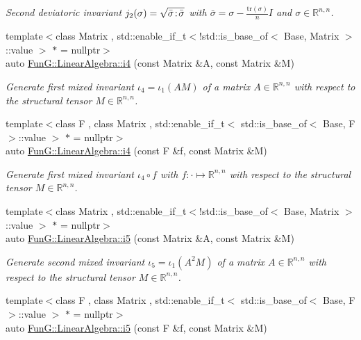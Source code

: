 \begin{DoxyCompactItemize}
\begin{DoxyCompactList}\small\item\em Second deviatoric invariant $ j_2(\sigma)=\sqrt{\bar\sigma\negthinspace:\negthinspace\bar\sigma} $ with $\bar\sigma = \sigma - \frac{\mathrm{tr}(\sigma)}{n}I$ and $\sigma\in\mathbb{R}^{n,n}$. \end{DoxyCompactList}\item 
{\footnotesize template$<$class Matrix , std\-::enable\-\_\-if\-\_\-t$<$!std\-::is\-\_\-base\-\_\-of$<$ Base, Matrix $>$\-::value $>$ $\ast$  = nullptr$>$ }\\auto \hyperlink{group__InvariantGroup_ga1898785172ecce11af0c27e54d555009}{Fun\-G\-::\-Linear\-Algebra\-::i4} (const Matrix \&A, const Matrix \&M)
\begin{DoxyCompactList}\small\item\em Generate first mixed invariant $ \iota_4=\iota_1(AM) $ of a matrix $A\in\mathbb{R}^{n,n}$ with respect to the structural tensor $M\in\mathbb{R}^{n,n}$. \end{DoxyCompactList}\item 
{\footnotesize template$<$class F , class Matrix , std\-::enable\-\_\-if\-\_\-t$<$ std\-::is\-\_\-base\-\_\-of$<$ Base, F $>$\-::value $>$ $\ast$  = nullptr$>$ }\\auto \hyperlink{group__InvariantGroup_ga0df96cdb1e4b8b5a040f2adc97c51100}{Fun\-G\-::\-Linear\-Algebra\-::i4} (const F \&f, const Matrix \&M)
\begin{DoxyCompactList}\small\item\em Generate first mixed invariant $ \iota_4\circ f $ with $f:\cdot\mapsto\mathbb{R}^{n,n}$ with respect to the structural tensor $M\in\mathbb{R}^{n,n}$. \end{DoxyCompactList}\item 
{\footnotesize template$<$class Matrix , std\-::enable\-\_\-if\-\_\-t$<$!std\-::is\-\_\-base\-\_\-of$<$ Base, Matrix $>$\-::value $>$ $\ast$  = nullptr$>$ }\\auto \hyperlink{group__InvariantGroup_gabedc42182203d883278e29fd16b355a0}{Fun\-G\-::\-Linear\-Algebra\-::i5} (const Matrix \&A, const Matrix \&M)
\begin{DoxyCompactList}\small\item\em Generate second mixed invariant $ \iota_5=\iota_1(A^2M) $ of a matrix $A\in\mathbb{R}^{n,n}$ with respect to the structural tensor $M\in\mathbb{R}^{n,n}$. \end{DoxyCompactList}\item 
{\footnotesize template$<$class F , class Matrix , std\-::enable\-\_\-if\-\_\-t$<$ std\-::is\-\_\-base\-\_\-of$<$ Base, F $>$\-::value $>$ $\ast$  = nullptr$>$ }\\auto \hyperlink{group__InvariantGroup_gaed7e47c39d89f2b01e25c992da78b44d}{Fun\-G\-::\-Linear\-Algebra\-::i5} (const F \&f, const Matrix \&M)

\end{DoxyCompactItemize}
